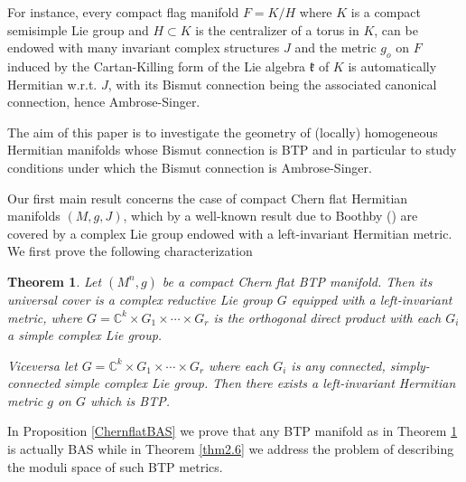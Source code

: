 \documentclass{amsart}
\numberwithin{equation}{section}
\newtheorem{theorem} {Theorem} [section]
\theoremstyle{definition}
\renewcommand{\1}{\mathds{1}}
\newcommand{\gk}{\mathfrak k}
\renewcommand{\>}{\rightarrow}
\begin{document}
For instance, every compact flag manifold $F=K/H$ where $K$ is a compact semisimple Lie group and $H\subset K$ is the centralizer of a torus in $K$, can be endowed with many invariant complex structures $J$ and the metric $g_o$ on $F$ induced by the Cartan-Killing form of the Lie algebra $\gk$ of $K$ is automatically Hermitian w.r.t. $J$, with  its Bismut connection being the associated canonical connection, hence Ambrose-Singer.

The aim of this paper is to investigate the geometry of (locally) homogeneous Hermitian manifolds whose Bismut connection is BTP and in particular to study conditions under which the Bismut connection is Ambrose-Singer.

Our first main result concerns the case of compact Chern flat Hermitian manifolds $(M,g,J)$, which by a well-known result due to Boothby (\cite{Boothby}) are covered by a complex Lie group endowed with a left-invariant Hermitian metric. We first prove the following characterization
\begin{theorem}\label{ThmChernflat} Let $(M^n,g)$ be a compact Chern flat {\rm BTP} manifold. Then its universal cover is a complex reductive Lie group $G$ equipped with a left-invariant metric, where $G={\mathbb C}^k\times G_1\times \cdots \times G_r$ is the orthogonal direct product with  each $G_i$  a simple complex Lie group.

Viceversa let $G={\mathbb C}^k \times G_1\times \cdots \times G_r$ where each $G_i$ is any connected, simply-connected simple complex Lie group. Then there exists a left-invariant Hermitian metric $g$ on $G$ which is {\rm BTP}.\end{theorem}

In Proposition \ref{ChernflatBAS} we prove that any {\rm BTP} manifold as in Theorem \ref{ThmChernflat} is actually {\rm BAS} while in Theorem \ref{thm2.6} we address the problem of describing the moduli space of such {\rm BTP}  metrics.
\end{document}
